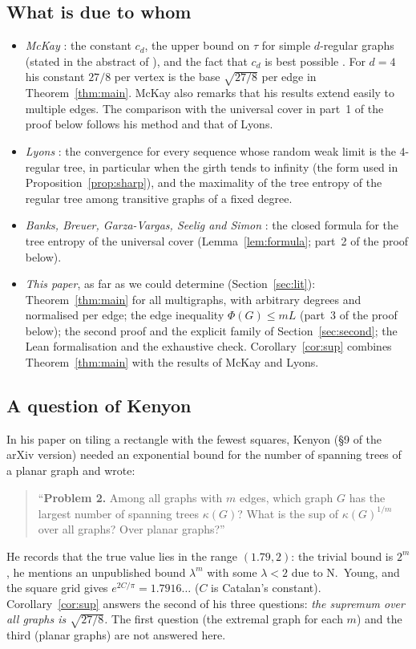 \documentclass[11pt]{amsart}
\theoremstyle{plain}
\theoremstyle{remark}
\begin{document}
\subsection*{What is due to whom}
\begin{itemize}
\item \emph{McKay} \cite{McKay}: the constant $c_d$, the upper bound on $\tau$ for simple $d$-regular graphs
  (stated in the abstract of \cite{McKay}), and the fact that $c_d$ is best possible \cite[Theorem~4.3]{McKay}.
  For $d=4$ his constant $27/8$ per vertex is the base $\sqrt{27/8}$ per edge in Theorem~\ref{thm:main}. McKay
  also remarks that his results extend easily to multiple edges. The comparison with the universal cover in
  part~1 of the proof below follows his method and that of Lyons.
\item \emph{Lyons} \cite{Lyons}: the convergence for every sequence whose random weak limit is the $4$-regular
  tree, in particular when the girth tends to infinity (the form used in Proposition~\ref{prop:sharp}), and the
  maximality of the tree entropy of the regular tree among transitive graphs of a fixed degree.
\item \emph{Banks, Breuer, Garza-Vargas, Seelig and Simon} \cite{BBGSS}: the closed formula for the tree entropy
  of the universal cover (Lemma~\ref{lem:formula}; part~2 of the proof below).
\item \emph{This paper}, as far as we could determine (Section~\ref{sec:lit}): Theorem~\ref{thm:main} for all
  multigraphs, with arbitrary degrees and normalised per edge; the edge inequality $\Phi(G)\le mL$ (part~3 of
  the proof below); the second proof and the explicit family of Section~\ref{sec:second}; the Lean formalisation
  and the exhaustive check. Corollary~\ref{cor:sup} combines Theorem~\ref{thm:main} with the results of McKay and
  Lyons.
\end{itemize}

\subsection*{A question of Kenyon}
In his paper on tiling a rectangle with the fewest squares, Kenyon \cite{Kenyon} (\S9 of the arXiv version) needed
an exponential bound
for the number of spanning trees of a planar graph and wrote:
\begin{quote}
``\textbf{Problem 2.} Among all graphs with $m$ edges, which graph $G$ has the largest number of spanning trees
$\kappa(G)$? What is the sup of $\kappa(G)^{1/m}$ over all graphs? Over planar graphs?''
\end{quote}
He records that the true value lies in the range $(1.79,2)$: the trivial bound is $2^m$, he mentions an unpublished
bound $\lambda^m$ with some $\lambda<2$ due to N.~Young, and the square grid gives $e^{2C/\pi}=1.7916\ldots$ ($C$ is
Catalan's constant). Corollary~\ref{cor:sup} answers the second of his three questions: \emph{the supremum over
all graphs is $\sqrt{27/8}$.} The first question (the extremal graph for each $m$) and the third (planar graphs) are not
answered here.
\end{document}
